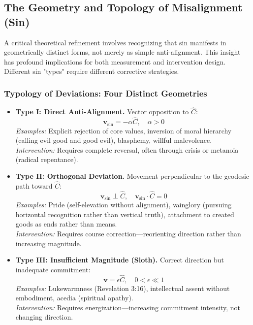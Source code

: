 \documentclass[11pt,a4paper]{article}
\theoremstyle{definition}
\theoremstyle{remark}
\begin{document}
\subsection{The Geometry and Topology of Misalignment (Sin)}

A critical theoretical refinement involves recognizing that sin manifests in geometrically distinct forms, not merely as simple anti-alignment. This insight has profound implications for both measurement and intervention design. Different sin "types" require different corrective strategies.

\subsubsection{Typology of Deviations: Four Distinct Geometries}

\begin{itemize}
    \item \textbf{Type I: Direct Anti-Alignment.} Vector opposition to \(\hat{C}\):
    \begin{equation}
        \mathbf{v}_{\text{sin}} = -\alpha \hat{C}, \quad \alpha > 0
    \end{equation}
    \textit{Examples:} Explicit rejection of core values, inversion of moral hierarchy (calling evil good and good evil), blasphemy, willful malevolence.\\
    \textit{Intervention:} Requires complete reversal, often through crisis or metanoia (radical repentance).
    
    \item \textbf{Type II: Orthogonal Deviation.} Movement perpendicular to the geodesic path toward \(\hat{C}\):
    \begin{equation}
        \mathbf{v}_{\text{sin}} \perp \hat{C}, \quad \mathbf{v}_{\text{sin}} \cdot \hat{C} = 0
    \end{equation}
    \textit{Examples:} Pride (self-elevation without alignment), vainglory (pursuing horizontal recognition rather than vertical truth), attachment to created goods as ends rather than means.\\
    \textit{Intervention:} Requires course correction—reorienting direction rather than increasing magnitude.
    
    \item \textbf{Type III: Insufficient Magnitude (Sloth).} Correct direction but inadequate commitment:
    \begin{equation}
        \mathbf{v} = \epsilon \hat{C}, \quad 0 < \epsilon \ll 1
    \end{equation}
    \textit{Examples:} Lukewarmness (Revelation 3:16), intellectual assent without embodiment, acedia (spiritual apathy).\\
    \textit{Intervention:} Requires energization—increasing commitment intensity, not changing direction.
    

\end{itemize}
\end{document}
